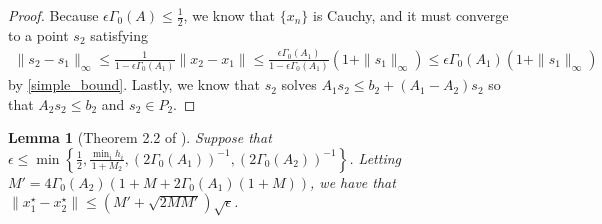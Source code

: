 \documentclass{article}
\newtheorem{lemma}[theorem]{Lemma}
\theoremstyle{case}
\newcommand{\huff}{{\Gamma_0}}
\begin{document}
\begin{proof}
Because $\epsilon \huff(A)\le\frac 1 2$, we know that $\{x_n\}$ is Cauchy, and it must converge to a point $s_2$ satisfying
\begin{align*}
\|s_2 - s_1\|_\infty \le \frac{1}{1 - \epsilon\huff(A_1)}\|x_2 - x_1\| \le \frac{\epsilon\huff(A_1)}{1 - \epsilon\huff(A_1)}\left(1 + \|s_1\|_{\infty}\right) \le \epsilon\huff(A_1)\left(1 + \|s_1\|_{\infty}\right)
\end{align*}
by \cref{simple_bound}.
Lastly, we know that $s_2$ solves $A_1s_2 \le b_2 + (A_1 - A_2)s_2$ so that $A_2s_2 \le b_2$ and $s_2 \in P_2$.
\end{proof}



\begin{lemma}[Theorem 2.2 of \cite{dummy:continuity}]
\label{2_2}
Suppose that $\epsilon\le \min\left\{\frac 1 2, \frac{\min_i h_i}{1 + M_2},\left(2\huff(A_1)\right)^{-1}, \left(2\huff(A_2)\right)^{-1}\right\}$.
Letting $M' = 4\huff(A_2)\left(1 + M + 2\huff(A_1)\left(1 + M\right)\right)$, we have that $\|x_1^{\star} - x_2^{\star}\| \le \left( M' + \sqrt{2MM'}\right)\sqrt{\epsilon}$.
\end{lemma}
\end{document}
